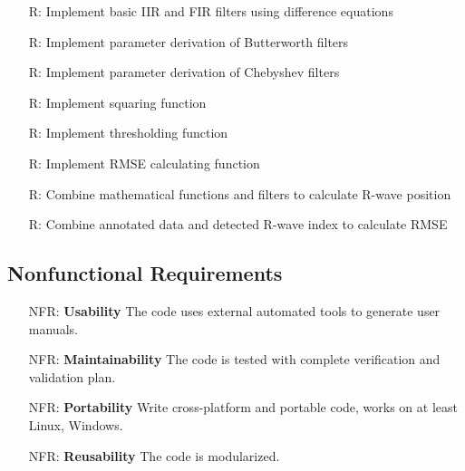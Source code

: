 \documentclass[12pt]{article}
\begin{document}
\noindent \begin{itemize}

\item[R\refstepcounter{reqnum}\thereqnum \label{R_basic_filters}:] Implement
basic IIR and FIR filters using difference equations

\item[R\refstepcounter{reqnum}\thereqnum \label{R_Butterworth}:] Implement
parameter derivation of Butterworth filters

\item[R\refstepcounter{reqnum}\thereqnum \label{R_Chebyshev}:] Implement
parameter derivation of Chebyshev filters

\item[R\refstepcounter{reqnum}\thereqnum \label{R_squaring}:] Implement squaring
function

\item[R\refstepcounter{reqnum}\thereqnum \label{R_thresholding}:] Implement
thresholding function

\item[R\refstepcounter{reqnum}\thereqnum \label{R_RMSE}:] Implement RMSE
calculating function

\item[R\refstepcounter{reqnum}\thereqnum \label{R_R_wave_position}:] Combine
mathematical functions and filters to calculate R-wave position

\item[R\refstepcounter{reqnum}\thereqnum \label{R_cal_RMSE}:] Combine annotated
data and detected R-wave index to calculate RMSE

\end{itemize}

\subsection{Nonfunctional Requirements}

\noindent \begin{itemize}

\item[NFR\refstepcounter{nfrnum}\thenfrnum \label{NFR_Usability}:]
  \textbf{Usability} The code uses external automated tools to generate user
  manuals.

\item[NFR\refstepcounter{nfrnum}\thenfrnum \label{NFR_Maintainability}:]
  \textbf{Maintainability} The code is tested with complete verification and
  validation plan.

\item[NFR\refstepcounter{nfrnum}\thenfrnum \label{NFR_Portability}:]
  \textbf{Portability} Write cross-platform and portable code, works on at least
  Linux, Windows.

\item[NFR\refstepcounter{nfrnum}\thenfrnum \label{NFR_Reusability}:]
  \textbf{Reusability} The code is modularized.

\end{itemize}
\end{document}
